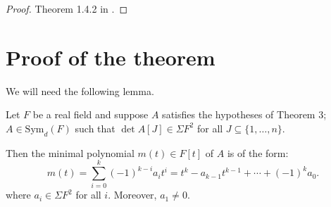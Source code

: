 \documentclass{article}
\newcommand*\Sym{\mathrm{Sym}}
\begin{document}
\begin{proof}
    Theorem 1.4.2 in \cite{NetzerRAG}.
\end{proof}

\section{Proof of the theorem}

We will need the following lemma.

\begin{lemma}
    \label{lem:4}
    Let $F$ be a real field and suppose $A$ satisfies the hypotheses of Theorem 3; $A \in \Sym_d(F)$ such that $\det A[J] \in \Sigma F^2$ for all $J \subseteq \{1,\ldots,n\}$.

    Then the minimal polynomial $m(t) \in F[t]$ of $A$ is of the form:
    \[
        m(t)
        =
        \sum_{i=0}^k
        (-1)^{k-i}a_it^i
        =
        t^k - a_{k-1}t^{k-1} + \cdots + (-1)^ka_0.
    \]
    where $a_i \in \Sigma F^2$ for all $i$.
    Moreover, $a_1 \neq 0$.
\end{lemma}
\end{document}
